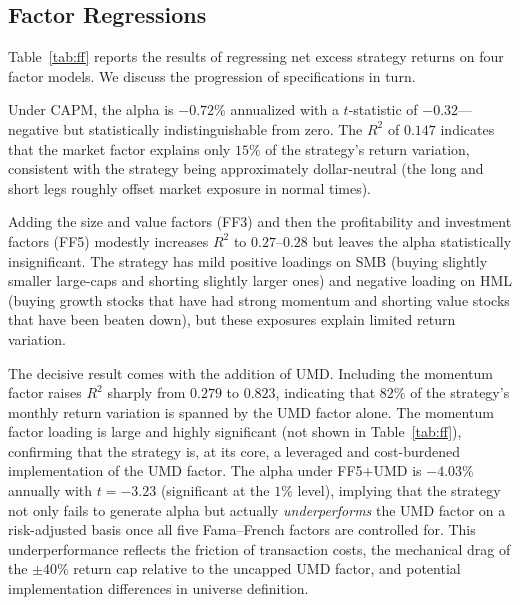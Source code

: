 \documentclass[11pt]{article}
\begin{document}
\subsection{Factor Regressions}

Table~\ref{tab:ff} reports the results of regressing net excess strategy returns on
four factor models. We discuss the progression of specifications in turn.

Under CAPM, the alpha is $-0.72\%$ annualized with a $t$-statistic of $-0.32$---negative
but statistically indistinguishable from zero. The $R^2$ of $0.147$ indicates that
the market factor explains only $15\%$ of the strategy's return variation, consistent
with the strategy being approximately dollar-neutral (the long and short legs roughly
offset market exposure in normal times).

Adding the size and value factors (FF3) and then the profitability and investment factors
(FF5) modestly increases $R^2$ to $0.27$--$0.28$ but leaves the alpha statistically
insignificant. The strategy has mild positive loadings on SMB (buying slightly smaller
large-caps and shorting slightly larger ones) and negative loading on HML (buying
growth stocks that have had strong momentum and shorting value stocks that have been
beaten down), but these exposures explain limited return variation.

The decisive result comes with the addition of UMD. Including the momentum factor
raises $R^2$ sharply from $0.279$ to $0.823$, indicating that $82\%$ of the strategy's
monthly return variation is spanned by the UMD factor alone. The momentum factor
loading is large and highly significant (not shown in Table~\ref{tab:ff}), confirming
that the strategy is, at its core, a leveraged and cost-burdened implementation of
the UMD factor. The alpha under FF5$+$UMD is $-4.03\%$ annually with $t = -3.23$
(significant at the $1\%$ level), implying that the strategy not only fails to generate
alpha but actually \emph{underperforms} the UMD factor on a risk-adjusted basis once
all five Fama--French factors are controlled for. This underperformance reflects the
friction of transaction costs, the mechanical drag of the $\pm40\%$ return cap relative
to the uncapped UMD factor, and potential implementation differences in universe
definition.
\end{document}
